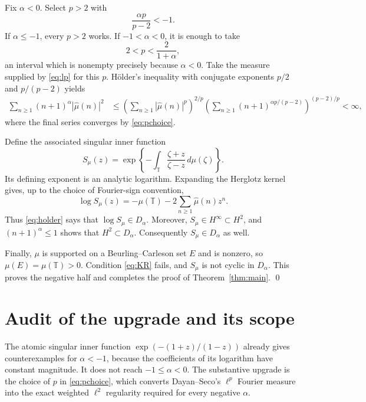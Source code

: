 \documentclass[11pt]{article}
\newcommand{\T}{\mathbb T}
\begin{document}
Fix $\alpha<0$.  Select $p>2$ with
\begin{equation}\label{eq:pchoice}
 \frac{\alpha p}{p-2}<-1.
\end{equation}
If $\alpha\leq-1$, every $p>2$ works.  If $-1<\alpha<0$, it is enough to
take
\[
 2<p<\frac{2}{1+\alpha},
\]
an interval which is nonempty precisely because $\alpha<0$.
Take the measure supplied by \eqref{eq:lp} for this $p$.  H\"older's
inequality with conjugate exponents $p/2$ and $p/(p-2)$ yields
\begin{align}
 \sum_{n\geq1}(n+1)^\alpha|\widehat\mu(n)|^2
 &\leq
 \left(\sum_{n\geq1}|\widehat\mu(n)|^p\right)^{2/p}
 \left(\sum_{n\geq1}(n+1)^{\alpha p/(p-2)}\right)^{(p-2)/p}
 <\infty,                                      \label{eq:holder}
\end{align}
where the final series converges by \eqref{eq:pchoice}.

Define the associated singular inner function
\[
 S_\mu(z)=\exp\left\{-\int_{\T}\frac{\zeta+z}{\zeta-z}\,d\mu(\zeta)\right\}.
\]
Its defining exponent is an analytic logarithm.  Expanding the Herglotz
kernel gives, up to the choice of Fourier-sign convention,
\begin{equation}\label{eq:logexpansion}
 \log S_\mu(z)=-\mu(\T)-2\sum_{n\geq1}\widehat\mu(n)z^n.
\end{equation}
Thus \eqref{eq:holder} says that $\log S_\mu\in D_\alpha$.  Moreover,
$S_\mu\in H^\infty\subset H^2$, and $(n+1)^\alpha\leq1$ shows that
$H^2\subset D_\alpha$.  Consequently $S_\mu\in D_\alpha$ as well.

Finally, $\mu$ is supported on a Beurling--Carleson set $E$ and is nonzero,
so $\mu(E)=\mu(\T)>0$.  Condition \eqref{eq:KR} fails, and $S_\mu$ is not
cyclic in $D_\alpha$.  This proves the negative half and completes the proof
of Theorem~\ref{thm:main}. \qed

\section{Audit of the upgrade and its scope}

The atomic singular inner function
$\exp(-(1+z)/(1-z))$ already gives counterexamples for $\alpha<-1$, because
the coefficients of its logarithm have constant magnitude.  It does not
reach $-1\leq\alpha<0$.  The substantive upgrade is the choice of $p$ in
\eqref{eq:pchoice}, which converts Dayan--Seco's $\ell^p$ Fourier measure into
the exact weighted $\ell^2$ regularity required for every negative
$\alpha$.
\end{document}

